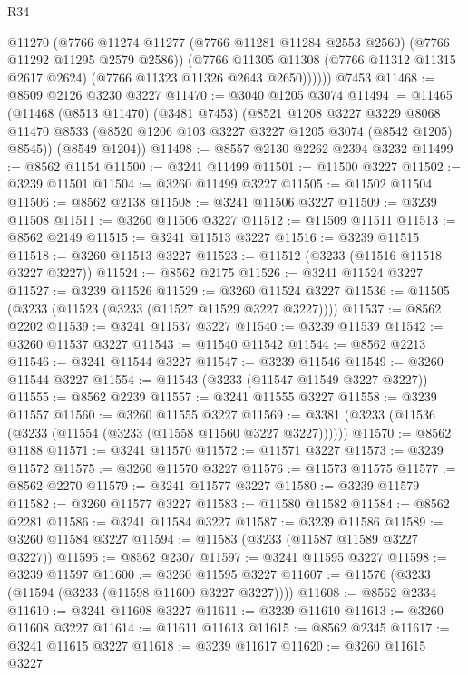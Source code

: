 \begin{lexlean}{R34}
\begin{coremodule}
            @11270
            (@7766
              @11274
              @11277
              (@7766 @11281 @11284 @2553 @2560)
              (@7766 @11292 @11295 @2579 @2586))
            (@7766
              @11305
              @11308
              (@7766 @11312 @11315 @2617 @2624)
              (@7766 @11323 @11326 @2643 @2650))))))
    @7453
@11468 := @8509 @2126 @3230 @3227
@11470 := @3040 @1205 @3074
@11494 := @11465
    (@11468
      (@8513 @11470)
      (@3481 @7453)
      (@8521
        @1208
        @3227
        @3229
        @8068
        @11470
        @8533
        (@8520 @1206 @103 @3227 @3227 @1205 @3074 (@8542 @1205) @8545))
      (@8549 @1204))
@11498 := @8557 @2130 @2262 @2394 @3232
@11499 := @8562 @1154
@11500 := @3241 @11499
@11501 := @11500 @3227
@11502 := @3239 @11501
@11504 := @3260 @11499 @3227
@11505 := @11502 @11504
@11506 := @8562 @2138
@11508 := @3241 @11506 @3227
@11509 := @3239 @11508
@11511 := @3260 @11506 @3227
@11512 := @11509 @11511
@11513 := @8562 @2149
@11515 := @3241 @11513 @3227
@11516 := @3239 @11515
@11518 := @3260 @11513 @3227
@11523 := @11512 (@3233 (@11516 @11518 @3227 @3227))
@11524 := @8562 @2175
@11526 := @3241 @11524 @3227
@11527 := @3239 @11526
@11529 := @3260 @11524 @3227
@11536 := @11505 (@3233 (@11523 (@3233 (@11527 @11529 @3227 @3227))))
@11537 := @8562 @2202
@11539 := @3241 @11537 @3227
@11540 := @3239 @11539
@11542 := @3260 @11537 @3227
@11543 := @11540 @11542
@11544 := @8562 @2213
@11546 := @3241 @11544 @3227
@11547 := @3239 @11546
@11549 := @3260 @11544 @3227
@11554 := @11543 (@3233 (@11547 @11549 @3227 @3227))
@11555 := @8562 @2239
@11557 := @3241 @11555 @3227
@11558 := @3239 @11557
@11560 := @3260 @11555 @3227
@11569 := @3381 (@3233 (@11536 (@3233 (@11554 (@3233 (@11558 @11560 @3227 @3227))))))
@11570 := @8562 @1188
@11571 := @3241 @11570
@11572 := @11571 @3227
@11573 := @3239 @11572
@11575 := @3260 @11570 @3227
@11576 := @11573 @11575
@11577 := @8562 @2270
@11579 := @3241 @11577 @3227
@11580 := @3239 @11579
@11582 := @3260 @11577 @3227
@11583 := @11580 @11582
@11584 := @8562 @2281
@11586 := @3241 @11584 @3227
@11587 := @3239 @11586
@11589 := @3260 @11584 @3227
@11594 := @11583 (@3233 (@11587 @11589 @3227 @3227))
@11595 := @8562 @2307
@11597 := @3241 @11595 @3227
@11598 := @3239 @11597
@11600 := @3260 @11595 @3227
@11607 := @11576 (@3233 (@11594 (@3233 (@11598 @11600 @3227 @3227))))
@11608 := @8562 @2334
@11610 := @3241 @11608 @3227
@11611 := @3239 @11610
@11613 := @3260 @11608 @3227
@11614 := @11611 @11613
@11615 := @8562 @2345
@11617 := @3241 @11615 @3227
@11618 := @3239 @11617
@11620 := @3260 @11615 @3227

\end{coremodule}
\end{lexlean}
